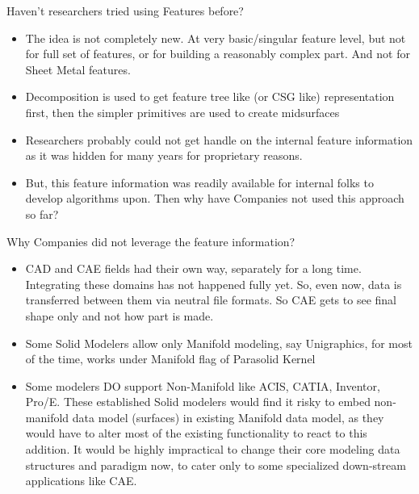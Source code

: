 
\begin{frame}[<+-| alert@+>]{Haven't researchers tried using Features before?}

\begin{itemize}[noitemsep,label=\textbullet,topsep=2pt,parsep=2pt,partopsep=2pt]
\item The idea is not completely new. At very basic/singular feature level, but not for full set of features, or for building a reasonably complex part. And not for Sheet Metal features.


\item Decomposition is used to get feature tree like (or CSG like) representation first, then the simpler primitives are used to create midsurfaces \cite{Chong2004}
\item Researchers probably could not get handle on the internal feature information as it was hidden for many years for proprietary reasons. 

\item But, this feature information was readily available for internal folks to develop algorithms upon. Then why have Companies not used this approach so far?

\end{itemize}
\end{frame}

\begin{frame}[<+-| alert@+>]{Why Companies did not leverage the feature information?}

\begin{itemize}[noitemsep,label=\textbullet,topsep=2pt,parsep=2pt,partopsep=2pt]
\item CAD and CAE fields had their own way, separately for a long time. Integrating these domains has not happened fully yet. So, even now, data is transferred between them via neutral file formats. So CAE gets to see final shape only and not how part is made.
\item Some Solid Modelers allow only Manifold modeling, say Unigraphics, for most of the time, works under Manifold flag of Parasolid Kernel
\item  Some modelers DO support Non-Manifold like ACIS, CATIA, Inventor, Pro/E. These established Solid modelers would find it risky to embed non-manifold data model (surfaces) in existing Manifold data model, as they would have to alter most of the existing functionality to react to this addition. It would be highly impractical to change their core modeling data structures and paradigm now, to cater only to some specialized down-stream applications like CAE.


\end{itemize}
\end{frame}

